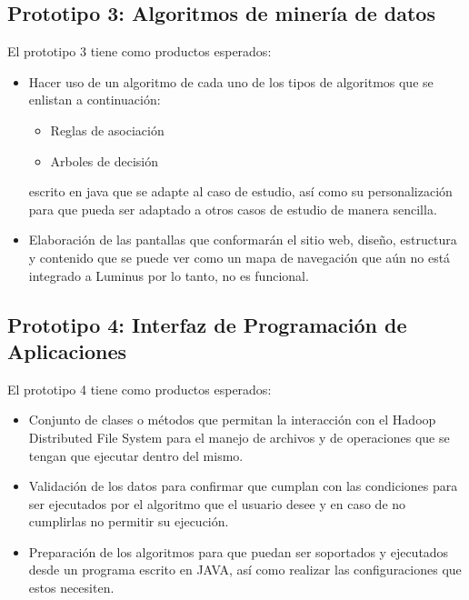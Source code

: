 \subsection{Prototipo 3: Algoritmos de minería de datos} 

\label{proto3} 

El prototipo 3 tiene como productos esperados: 

\begin{itemize} 

    \item Hacer uso de un algoritmo de cada uno de los tipos de algoritmos que se enlistan a continuación: 

    \begin{itemize} 

        \item Reglas de asociación 

        \item Arboles de decisión 

    \end{itemize} 

     escrito en java que se adapte al caso de estudio, así como su personalización para que pueda ser adaptado a otros casos de estudio de manera sencilla. 

    \item Elaboración de las pantallas que conformarán el sitio web, diseño, estructura y contenido que se puede ver como un mapa de navegación que aún no está integrado a Luminus por lo tanto, no es funcional.   

\end{itemize} 
\subsection{Prototipo 4: Interfaz de Programación de Aplicaciones} 

El prototipo 4 tiene como productos esperados: 

\begin{itemize} 

     \item Conjunto de clases o métodos que permitan la interacción con el Hadoop Distributed File System para el manejo de archivos y de operaciones que se tengan que ejecutar dentro del mismo. 

     \item Validación de los datos para confirmar que cumplan con las condiciones para ser ejecutados por el algoritmo que el usuario desee y en caso de no cumplirlas no permitir su ejecución. 

     \item Preparación de los algoritmos para que puedan ser soportados y ejecutados desde un programa escrito en JAVA, así como realizar las configuraciones que estos necesiten. 

\end{itemize} 

